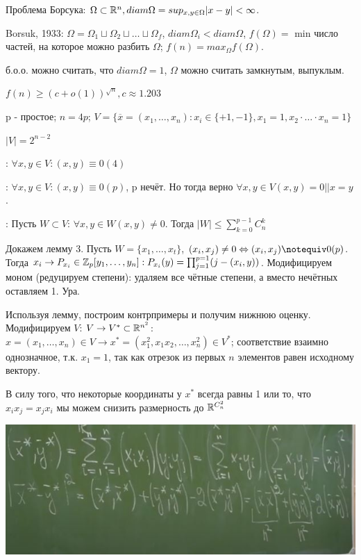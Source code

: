 Проблема Борсука: $\Omega \subset \mathbb{R}^n, diam \Omega = sup_{x, y \in \Omega} |x - y| < \infty$.

Borsuk, 1933: $\Omega = \Omega_1 \sqcup \Omega_2 \sqcup \dots \sqcup \Omega_f$, $diam \Omega_i < diam \Omega$, $f(\Omega) = $ min число частей, на которое можно разбить $\Omega$; $f(n) = max_{\Omega} f(\Omega)$.

б.о.о. можно считать, что $diam \Omega = 1$, $\Omega$ можно считать замкнутым, выпуклым.

\Th $f(n) \geqslant (c + o(1))^{\sqrt{n}}, c \approx 1.203$

\Proof
p - простое; $n = 4p$; $V = \{\overline{x} = (x_1, \dots, x_n) : x_i \in \{+1, -1\}, x_1 = 1, x_2 \cdot \dots \cdot x_n = 1\}$

$|V| = 2^{n-2}$

: $\forall x, y \in V: (x, y) \equiv 0 (4)$

: $\forall x, y \in V: (x, y) \equiv 0 (p)$, p нечёт. Но тогда верно $\forall x, y \in V (x, y) = 0 || x = y$.

: Пусть $W \subset V$: $\forall x, y \in W (x, y) \neq 0$. Тогда $|W| \leqslant \sum_{k=0}^{p-1}C_n^k$

Докажем лемму 3. Пусть $W = \{x_1, \dots, x_t\}$, $(x_i, x_j) \neq 0 \Leftrightarrow (x_i, x_j) \notequiv 0 (p)$. Тогда $x_i \to P_{x_i} \in \mathbb{Z}_p[y_1, \dots, y_n]: P_{x_i}(y) = \prod_{j=1}^{p=1} (j - (x_i, y))$. Модифицируем моном (редуцируем степени): удаляем все чётные степени, а вместо нечётных оставляем 1. Ура.

Используя лемму, построим контрпримеры и получим нижнюю оценку. Модифицируем $V$: $V \to V^* \subset \mathbb{R}^{n^2}$: $x = (x_1, \dots, x_n) \in V \to x^* = (x_1^2, x_1x_2, \dots, x_n^2) \in V^*$; соответствие взаимно однозначное, т.к. $x_1 = 1$, так как отрезок из первых $n$ элементов равен исходному вектору.

В силу того, что некоторые координаты у $x^*$ всегда равны 1 или то, что $x_ix_j = x_jx_i$ мы можем снизить размерность до $\mathbb{R}^{C_n^2}$

\includegraphics[]{images/73.JPG}

